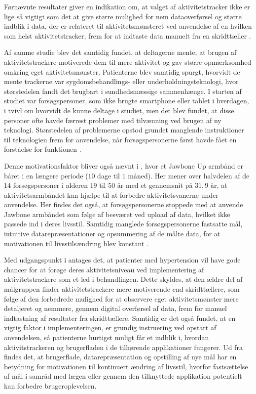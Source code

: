 Førnævnte resultater giver en indikation om, at valget af aktivitetstracker ikke er lige så vigtigt som det at give større mulighed for nem dataoverførsel og større indblik i data, der er relateret til aktivitetsmønsteret ved anvendelse af en hvilken som helst aktivitetstracker, frem for at indtaste data manuelt fra en skridttæller \citep{mercer2016}.

Af samme studie blev det samtidig fundet, at deltagerne mente, at brugen af aktivitetstrackere motiverede dem til mere aktivitet og gav større opmærksomhed omkring eget aktivitetsmønster. Patienterne blev samtidig spurgt, hvorvidt de mente trackerne var sygdomsbehandlings- eller underholdningsteknologi, hvor størstedelen fandt det brugbart i sundhedsmæssige sammenhænge. I starten af studiet var forsøgspersoner, som ikke brugte smartphone eller tablet i hverdagen, i tvivl om hvorvidt de kunne deltage i studiet, men det blev fundet, at disse personer ofte havde færrest problemer med tilvænning ved brugen af ny teknologi. Størstedelen af problemerne opstod grundet manglende instruktioner til teknologien frem for anvendelse, når forsøgspersonerne først havde fået en forståelse for funktionen \citep{mercer2016}.

Denne motivationsfaktor bliver også nævnt i \citeauthor{rapp2016}, hvor et Jawbone Up armbånd er båret i en længere periode ($10$ dage til $1$ måned). Her mener over halvdelen af de $14$ forsøgspersoner i alderen $19$ til $50$ år med et gennemsnit på $31,9$ år, at aktivitetsarmbåndet kan hjælpe til at forbedre aktivitetsvanerne under anvendelse. Her findes det også, at forsøgspersonerne stoppede med at anvende Jawbone armbåndet som følge af besværet ved upload af data, hvilket ikke passede ind i deres livsstil. Samtidig manglede forsøgspersonerne fastsatte mål, intuitive datarepræsentationer og opsummering af de målte data, for at motivationen til livsstilsændring blev konstant \citep{rapp2016}.

Med udgangspunkt i \citeauthor{mercer2016} antages det, at patienter med hypertension vil have gode chancer for at forøge deres aktivitetsniveau ved implementering af aktivitetstrackere som et led i behandlingen. Dette skyldes, at den ældre del af målgruppen finder aktivitetstrackere mere motiverende end skridttællere, som følge af den forbedrede mulighed for at observere eget aktivitetsmønster mere detaljeret og nemmere, gennem digital overførsel af data, frem for manuel indtastning af resultater fra skridttællere. Samtidig er det også fundet, at en vigtig faktor i implementeringen, er grundig instruering ved opstart af anvendelsen, så patienterne hurtigst muligt får et indblik i, hvordan aktivitstrackeren og brugerfladen i de tilhørende applikationer fungerer. Ud fra \citeauthor{rapp2016} findes det, at brugerflade, datarepræsentation og opstilling af nye mål har en betydning for motivationen til kontinuert ændring af livsstil, hvorfor fastsættelse af mål i samråd med lægen eller gennem den tilknyttede applikation potentielt kan forbedre brugeroplevelsen.


